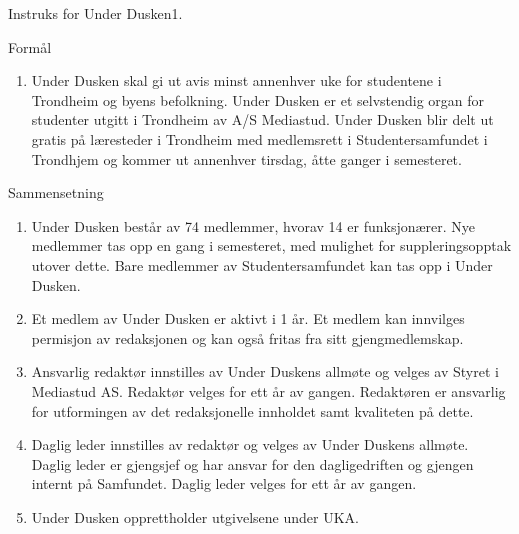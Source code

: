 
\begin{instruks}{Instruks for Under Dusken}{1. }{ }

    \begin{instruksledd}{Formål}
        \begin{enumerate}
            \item Under Dusken skal gi ut avis minst annenhver uke for studentene i Trondheim og
                byens befolkning. Under Dusken er et selvstendig organ for studenter utgitt i Trondheim av A/S
                Mediastud. Under Dusken blir delt ut gratis på læresteder i Trondheim med medlemsrett i
                Studentersamfundet i Trondhjem og kommer ut annenhver tirsdag, åtte ganger i semesteret.
        \end{enumerate}
    \end{instruksledd}

    \begin{instruksledd}{Sammensetning}
        \begin{enumerate}
            \item Under Dusken består av 74 medlemmer, hvorav 14 er funksjonærer. Nye medlemmer tas
                opp en gang i semesteret, med mulighet for suppleringsopptak utover dette. Bare medlemmer av
                Studentersamfundet kan tas opp i Under Dusken.
            \item Et medlem av Under Dusken er aktivt i 1 år. Et medlem kan innvilges permisjon av
                redaksjonen og kan også fritas fra sitt gjengmedlemskap.
            \item Ansvarlig redaktør innstilles av Under Duskens allmøte og velges av Styret i
                Mediastud AS. Redaktør velges for ett år av gangen. Redaktøren er ansvarlig for utformingen av det
                redaksjonelle innholdet samt kvaliteten på dette.
            \item Daglig leder innstilles av redaktør og velges av Under Duskens allmøte.
                Daglig leder er gjengsjef og har ansvar for den dagligedriften og gjengen internt på Samfundet.
                Daglig leder velges for ett år av gangen.
            \item Under Dusken opprettholder utgivelsene under UKA.
        \end{enumerate}
    \end{instruksledd}


\end{instruks}
